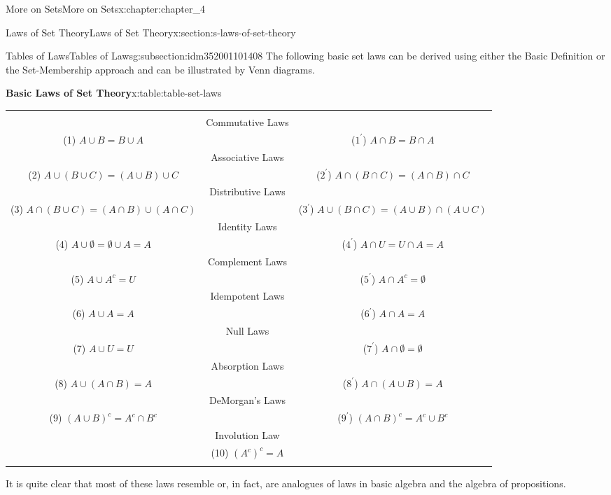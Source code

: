 \documentclass[oneside,10pt,]{book}
\newcommand{\tabularfont}{\relax}
\newcommand{\hrulethin}  {\noalign{\hrule height 0.04em}}
\begin{document}
\begin{chapterptx}{More on Sets}{}{More on Sets}{}{}{x:chapter:chapter_4}
\typeout{************************************************}
%
\begin{sectionptx}{Laws of Set Theory}{}{Laws of Set Theory}{}{}{x:section:s-laws-of-set-theory}
%
%
\typeout{************************************************}
\typeout{************************************************}
%
\begin{subsectionptx}{Tables of Laws}{}{Tables of Laws}{}{}{g:subsection:idm352001101408}
The following basic set laws can be derived using either the Basic Definition or the Set-Membership approach and can be illustrated by Venn diagrams.%
\begin{tableptx}{\textbf{Basic Laws of Set Theory}}{x:table:table-set-laws}{}%
\centering
{\tabularfont%
\begin{tabular}{ccc}
&&\tabularnewline[0pt]
&Commutative Laws&\tabularnewline[0pt]
(1) \(A \cup B = B \cup  A\)&&(\(1^{\prime}\)) \(A \cap B = B\cap A\)\tabularnewline\hrulethin
&Associative Laws&\tabularnewline[0pt]
(2) \(A \cup  (B \cup  C)= (A\cup B)\cup C\)&&(\(2^{\prime}\)) \(A \cap  (B \cap  C) = (A \cap  B) \cap  C \)\tabularnewline\hrulethin
&Distributive Laws&\tabularnewline[0pt]
(3) \(A\cap (B \cup  C)=(A\cap B )\cup (A\cap  C)\)&&(\(3^{\prime}\)) \(A \cup (B \cap C) = (A \cup B ) \cap (A\cup C)\)\tabularnewline\hrulethin
&Identity Laws&\tabularnewline[0pt]
(4) \(A \cup  \emptyset  = \emptyset  \cup  A = A\)&&(\(4^{\prime}\)) \(A \cap  U = U \cap  A = A\)\tabularnewline\hrulethin
&Complement Laws&\tabularnewline[0pt]
(5) \(A\cup A^c= U\)&&(\(5^{\prime}\)) \(A\cap A^c= \emptyset\)\tabularnewline\hrulethin
&Idempotent Laws&\tabularnewline[0pt]
(6) \(A \cup  A = A\)&&(\(6^{\prime}\)) \(A\cap  A = A\)\tabularnewline\hrulethin
&Null Laws&\tabularnewline[0pt]
(7) \(A \cup  U = U\)&&(\(7^{\prime}\)) \(A \cap  \emptyset  =\emptyset\)\tabularnewline\hrulethin
&Absorption Laws&\tabularnewline[0pt]
(8) \(A \cup  (A\cap  B) = A\)&&(\(8^{\prime}\)) \(A\cap (A \cup  B) = A\)\tabularnewline\hrulethin
&DeMorgan's Laws&\tabularnewline[0pt]
(9) \((A \cup  B)^c= A^c\cap  B^c\)&&(\(9^{\prime}\)) \((A\cap  B)^c = A^c \cup  B^c\)\tabularnewline\hrulethin
&Involution Law&\tabularnewline[0pt]
&(10) \((A^c)^c= A\)&\tabularnewline\hrulethin
\end{tabular}
}%
\end{tableptx}%
It is quite clear that most of these laws resemble or, in fact, are analogues of laws in basic algebra and the algebra of propositions.%
\end{subsectionptx}
%
%
\typeout{************************************************}

\end{sectionptx}
\end{chapterptx}
\end{document}
